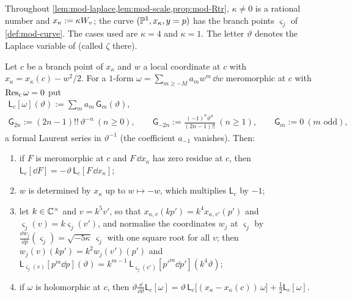 Throughout \cref{lem:mod-laplace,lem:mod-scale,prop:mod-Rtr}, $\kappa\neq 0$ is a rational number and $x_\kappa:=\kappa W_{v}$; the curve $(\mathbb{P}^1,x_\kappa,y=p)$ has the branch points $\varsigma_j$ of \cref{def:mod-curve}. The cases used are $\kappa=4$ and $\kappa=1$. The letter $\vartheta$ denotes the Laplace variable of \cite[(2-31), (2-32)]{Dunin-Barkowski:2015caa} (called $\zeta$ there).

\begin{lem}
\label{lem:mod-laplace}
Let $c$ be a branch point of $x_\kappa$ and $w$ a local coordinate at $c$ with $x_\kappa=x_\kappa(c)-w^2/2$. For a $1$-form $\omega=\sum_{m\geq -M}a_mw^m\,\dd w$ meromorphic at $c$ with $\operatorname*{Res}_c\omega=0$ put
\begin{equation}
\label{eq:mod-laplace}
\begin{gathered}
\mathsf L_c[\omega](\vartheta):=\sum_ma_m\,\mathsf G_m(\vartheta),\\
\mathsf G_{2n}:=(2n-1)!!\,\vartheta^{-n}\ (n\geq 0),\qquad \mathsf G_{-2n}:=\frac{(-1)^n\vartheta^n}{(2n-1)!!}\ (n\geq 1),\qquad \mathsf G_m:=0\ (m\text{ odd}),
\end{gathered}
\end{equation}
a formal Laurent series in $\vartheta^{-1}$ (the coefficient $a_{-1}$ vanishes). Then:
\begin{enumerate}
\item if $F$ is meromorphic at $c$ and $F\,\dd x_\kappa$ has zero residue at $c$, then $\mathsf L_c[\dd F]=-\vartheta\,\mathsf L_c[F\,\dd x_\kappa]$;
\item $w$ is determined by $x_\kappa$ up to $w\mapsto -w$, which multiplies $\mathsf L_c$ by $-1$;
\item let $k\in\mathbb{C}^\times$ and $v=k^5v'$, so that $x_{\kappa,v}(kp')=k^4x_{\kappa,v'}(p')$ and $\varsigma_j(v)=k\varsigma_j(v')$, and normalise the coordinates $w_j$ at $\varsigma_j$ by $\frac{\dd w_j}{\dd p}(\varsigma_j)=\sqrt{-5\kappa}\,\varsigma_j$ with one square root for all $v$; then $w_j(v)(kp')=k^2w_j(v')(p')$ and $\mathsf L_{\varsigma_j(v)}[p^m\dd p](\vartheta)=k^{m-1}\,\mathsf L_{\varsigma_j(v')}[p'^m\dd p'](k^4\vartheta)$;
\item if $\omega$ is holomorphic at $c$, then $\vartheta\frac{\dd}{\dd\vartheta}\mathsf L_c[\omega]=\vartheta\,\mathsf L_c\big[(x_\kappa-x_\kappa(c))\,\omega\big]+\frac12\mathsf L_c[\omega]$.
\end{enumerate}
\end{lem}

